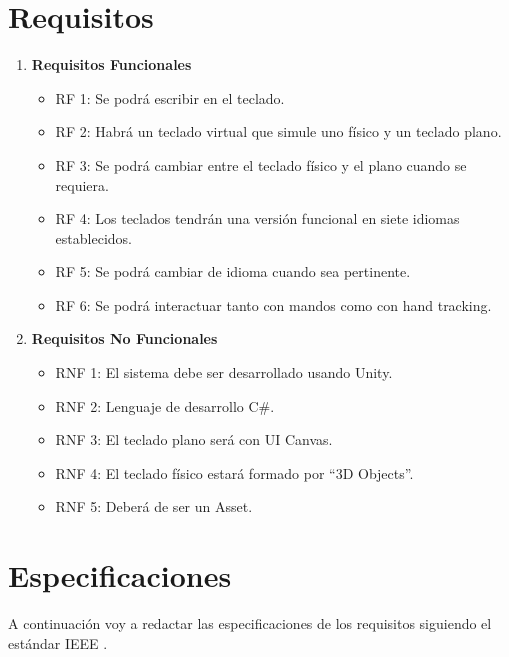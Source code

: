 
\section{Requisitos}
\label{sec:3.1}

\begin{enumerate}
	\item \textbf{Requisitos Funcionales}
	\begin{itemize}
		\item RF 1: Se podrá escribir en el teclado.
		\item RF 2: Habrá un teclado virtual que simule uno físico y un teclado plano. 
		\item RF 3: Se podrá cambiar entre el teclado físico y el plano cuando se requiera. 
		\item RF 4: Los teclados tendrán una versión funcional en siete idiomas establecidos.
		\item RF 5: Se podrá cambiar de idioma cuando sea pertinente.
		\item RF 6: Se podrá interactuar tanto con mandos como con hand tracking. 
	\end{itemize}
	\item \textbf{Requisitos No Funcionales}
	\begin{itemize}
		\item RNF 1: El sistema debe ser desarrollado usando Unity. 
		\item RNF 2: Lenguaje de desarrollo C\#.
		\item RNF 3: El teclado plano será con UI Canvas.
		\item RNF 4: El teclado físico estará formado por ``3D Objects''.
		\item RNF 5: Deberá de ser un Asset.
	\end{itemize}
\end{enumerate}





\section{Especificaciones}
A continuación voy a redactar las especificaciones de los requisitos siguiendo el estándar IEEE \cite{ieee830-1993}.


